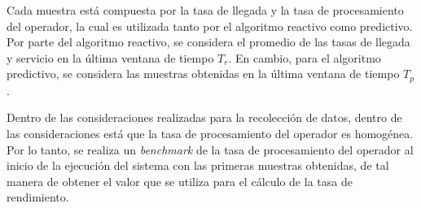 
\normalsize{Cada muestra est\'a compuesta por la tasa de llegada y la tasa de procesamiento del operador, la cual es utilizada tanto por el algoritmo reactivo como predictivo. Por parte del algoritmo reactivo, se considera el promedio de las tasas de llegada y servicio en la \'ultima ventana de tiempo $T_r$. En cambio, para el algoritmo predictivo, se considera las muestras obtenidas en la \'ultima ventana de tiempo $T_p$.

Dentro de las consideraciones realizadas para la recolecci\'on de datos, dentro de las consideraciones est\'a que la tasa de procesamiento del operador es homog\'enea. Por lo tanto, se realiza un \textit{benchmark} de la tasa de procesamiento del operador al inicio de la ejecuci\'on del sistema con las primeras muestras obtenidas, de tal manera de obtener el valor que se utiliza para el c\'alculo de la tasa de rendimiento.}



